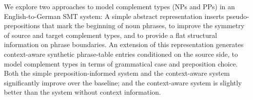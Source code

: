 We explore two approaches to model complement types (NPs and PPs) in an English-to-German SMT system: A simple abstract representation inserts pseudo-prepositions that mark the beginning of noun phrases, to improve the symmetry of source and target complement types, and to provide a flat structural information on phrase boundaries. An extension of this representation generates context-aware synthetic phrase-table entries conditioned on the source side, to model complement types in terms of grammatical case and preposition choice. Both the simple preposition-informed system and the context-aware system significantly improve over the baseline; and the context-aware system is slightly better than the system without context information.

